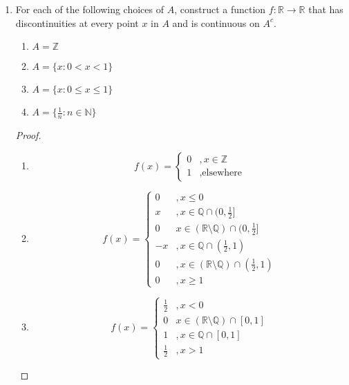 \begin{enumerate}
\begin{proof}
\begin{enumerate}
            \item From (b) we know that \( f \) is continuous on all of \( \mathbb{R} \). From (c) we also know that \( f \) and \( g(x) = kx \) must be identical on all of \( \mathbb{Q} \). Therefore, from Exercise 8, we know that \( f=g \) on all of \( \mathbb{R} \). Therefore \( f(x) = kx \) for all \( x \in \mathbb{R} \). 
        \end{enumerate}
        \end{proof}
        
        \item For each of the following choices of \( A \), construct a function \( f: \mathbb{R} \rightarrow \mathbb{R} \) that has discontinuities at every point \( x \) in \( A \) and is continuous on \( A^{c} \).
        \begin{enumerate}
            \item \( A = \mathbb{Z} \)
            \item \( A = \{ x: 0 < x < 1 \} \)
            \item \( A = \{ x: 0 \leq x \leq 1 \} \)
            \item \( A = \{ \frac{1}{n}: n \in \mathbb{N} \} \)
        \end{enumerate}
        \begin{proof}
        \begin{enumerate}
            \item
            \[
            f(x) = \begin{cases} 0 & ,x \in \mathbb{Z} \\ 1 & ,\text{elsewhere} \end{cases}
            \]
            
            \item 
            \[
            f(x) = \begin{cases} 0 & , x \leq 0 \\ x & , x \in \mathbb{Q} \cap (0, \frac{1}{2}] \\ 0 & x \in (\mathbb{R} \setminus \mathbb{Q}) \cap (0,\frac{1}{2}] \\ -x &, x \in \mathbb{Q} \cap (\frac{1}{2}, 1) \\ 0 &, x \in (\mathbb{R} \setminus \mathbb{Q}) \cap (\frac{1}{2}, 1) \\ 0 &, x \geq 1 \end{cases}
            \]
            
            \item 
            \[
            f(x) = \begin{cases} \frac{1}{2} &, x < 0 \\ 0 & x \in (\mathbb{R} \setminus \mathbb{Q}) \cap [0,1] \\ 1 &, x \in \mathbb{Q} \cap [0,1] \\ \frac{1}{2} &, x > 1\end{cases}
            \]
            

\end{enumerate}
\end{proof}
\end{enumerate}
